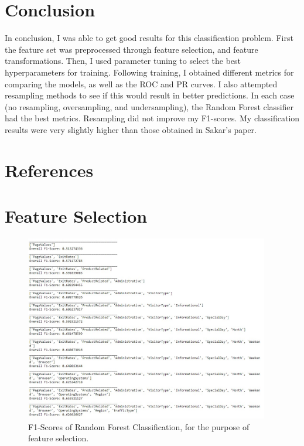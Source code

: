 \documentclass{article}
\begin{document}
\section{Conclusion}

In conclusion, I was able to get good results for this classification problem. First the feature set was preprocessed through feature selection, and feature transformations. Then, I used parameter tuning to select the best hyperparameters for training. Following training, I obtained different metrics for comparing the models, as well as the ROC and PR curves. I also attempted resampling methods to see if this would result in better predictions. In each case (no resampling, oversampling, and undersampling), the Random Forest classifier had the best metrics. Resampling did not improve my F1-scores. My classification results were very slightly higher than those obtained in Sakar's paper.

\newpage
\section{References}
\printbibliography[heading=none]
\newpage

\appendix
\section{Feature Selection}
\label{app:part1}

\begin{figure}[h!]
\includegraphics[width=0.95\textwidth]{featureSelectionF1Score}
\caption{F1-Scores of Random Forest Classification, for the purpose of feature selection.}
\label{fig:featureSelection}
\end{figure}
 
\end{document}
